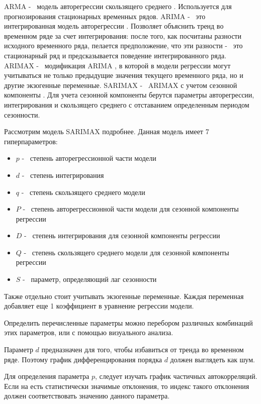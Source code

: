 ARMA -~ модель авторегрессии скользящего среднего \cite{torres2005forecast}. Используется для прогнозирования
стационарных временных рядов.
ARIMA -~ это интегрированная модель авторегрессии \cite{contreras2003arima}. Позволяет объяснить тренд во временном
ряде за счет интегрирования: после того, как посчитаны разности исходного временного ряда,
пелается предположение, что эти разности -~ это стационарный ряд и предсказывается поведение
интегрированного ряда.
ARIMAX -~ модификация ARIMA \cite{peter2012arima}, в которой в модели регрессии могут учитываться не только предыдущие значения
текущего временного ряда, но и другие экзогенные переменные.
SARIMAX -~ ARIMAX с учетом сезонной компоненты \cite{omenzetter2005seasonal}. Для учета сезонной компоненты
берутся параметры авторегрессии, интегрирования и скользящего среднего с отставанием
определенным периодом сезонности.

Рассмотрим модель SARIMAX подробнее. Данная модель имеет 7 гиперпараметров:
\begin{itemize}
	\item $ p $ -~ степень авторегрессионной части модели
	\item $ d $ -~ степень интегрирования
	\item $ q $ -~ степень скользящего среднего модели
	\item $ P $ -~ степень авторегрессионной части модели для сезонной компоненты регрессии
	\item $ D $ -~ степень интегрирования для сезонной компоненты регрессии
	\item $ Q $ -~ степень скользящего среднего модели для сезонной компоненты регрессии
	\item $ S $ -~ параметр, определяющий лаг сезонности
\end{itemize}

Также отдельно стоит учитывать экзогенные переменные. Каждая переменная добавляет еще 1 коэффициент
в уравнение регрессии модели.

Определить перечисленные параметры можно перебором различных комбинаций этих параметров,
или с помощью визуального анализа.

Параметр $ d $ предназначен для того, чтобы избавиться от тренда во временном
ряде. Поэтому график дифференцирования порядка $ d $ должен выглядеть как шум.

Для определения параметра $ p $, следует изучать график частичных автокорреляций.
Если на есть статистически значимые отклонения, то индекс такого отклонения должен соответствовать
значению данного параметра.

